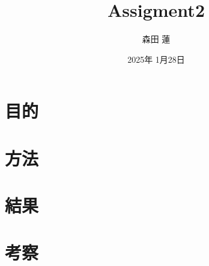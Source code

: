 \documentclass{jlreq}
\title{Assigment2}
\author{森田 蓮}
\date{2025年 1月28日}
\begin{document}
\maketitle

\section{目的}


\section{方法}

\section{結果}


\section{考察}
\end{document}
